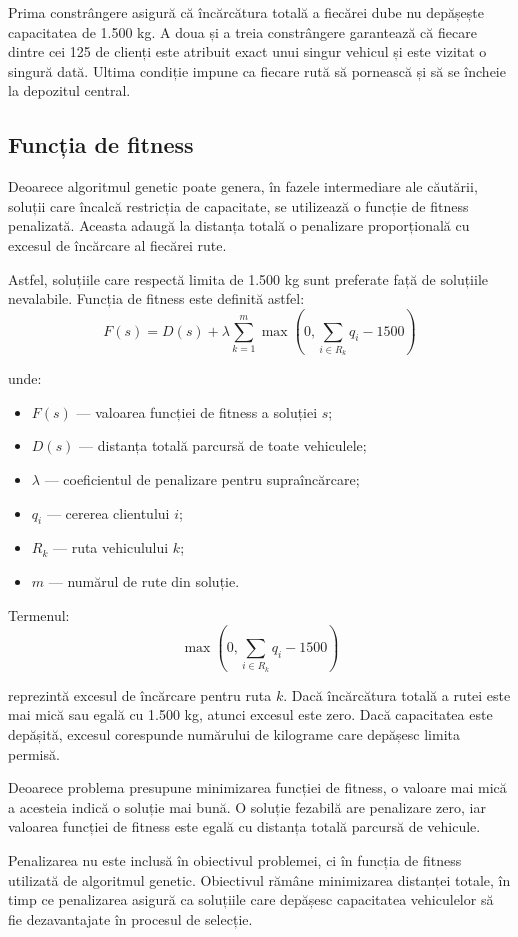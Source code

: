 \documentclass[12pt,a4paper]{article}
\begin{document}
Prima constrângere asigură că încărcătura totală a fiecărei dube nu depășește capacitatea de 1.500 kg. A doua și a treia constrângere garantează că fiecare dintre cei 125 de clienți este atribuit exact unui singur vehicul și este vizitat o singură dată. Ultima condiție impune ca fiecare rută să pornească și să se încheie la depozitul central.

\subsection{Funcția de fitness}

Deoarece algoritmul genetic poate genera, în fazele intermediare ale căutării, soluții care încalcă restricția de capacitate, se utilizează o funcție de fitness penalizată. Aceasta adaugă la distanța totală o penalizare proporțională cu excesul de încărcare al fiecărei rute.

Astfel, soluțiile care respectă limita de 1.500 kg sunt preferate față de soluțiile nevalabile. Funcția de fitness este definită astfel:
\begin{equation}
F(s)=D(s)+\lambda\sum_{k=1}^{m}
\max\left(0,\sum_{i\in R_k}q_i-1500\right)
\end{equation}

unde:
\begin{itemize}
    \item $F(s)$ — valoarea funcției de fitness a soluției $s$;
    \item $D(s)$ — distanța totală parcursă de toate vehiculele;
    \item $\lambda$ — coeficientul de penalizare pentru supraîncărcare;
    \item $q_i$ — cererea clientului $i$;
    \item $R_k$ — ruta vehiculului $k$;
    \item $m$ — numărul de rute din soluție.
\end{itemize}

Termenul:
\begin{equation}
\max\left(0,\sum_{i\in R_k}q_i-1500\right)
\end{equation}

reprezintă excesul de încărcare pentru ruta $k$. Dacă încărcătura totală a rutei este mai mică sau egală cu 1.500 kg, atunci excesul este zero. Dacă capacitatea este depășită, excesul corespunde numărului de kilograme care depășesc limita permisă.

Deoarece problema presupune minimizarea funcției de fitness, o valoare mai mică a acesteia indică o soluție mai bună. O soluție fezabilă are penalizare zero, iar valoarea funcției de fitness este egală cu distanța totală parcursă de vehicule.

Penalizarea nu este inclusă în obiectivul problemei, ci în funcția de fitness utilizată de algoritmul genetic. Obiectivul rămâne minimizarea distanței totale, în timp ce penalizarea asigură ca soluțiile care depășesc capacitatea vehiculelor să fie dezavantajate în procesul de selecție.
\end{document}
